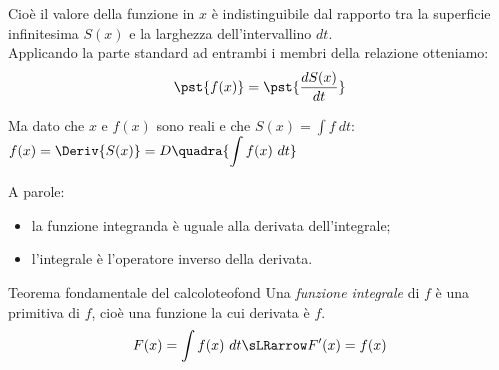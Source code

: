 Cioè il valore della funzione in \(x\) è indistinguibile dal rapporto tra 
la superficie infinitesima \(S(x)\) e la larghezza dell'intervallino 
\(dt\). \\
Applicando la parte standard ad entrambi i membri della relazione 
otteniamo: 
\[\pst{f(x)} = \pst{\dfrac{d S(x)}{dt}}\]

Ma dato che \(x\) e \(f(x)\) sono reali e che 
\(\displaystyle S(x) = \int f~dt\): \quad 
\(\displaystyle f(x) =\Deriv{S(x)} = D\quadra{\int f(x)~dt}\)

A parole: 
\begin{itemize} [nosep]
 \item la funzione integranda è uguale alla derivata dell'integrale;
 \item l'integrale è l'operatore inverso della derivata.
\end{itemize}

\bigskip
{}

\begin{newtheo}{Teorema fondamentale del calcolo}{teofond}
Una \emph{funzione integrale} di \(f\) è una primitiva di \(f\),
cioè una funzione la cui derivata è \(f\).
\[F(x) = \int f(x)~dt \sLRarrow F'(x) = f(x)\]
\end{newtheo}

